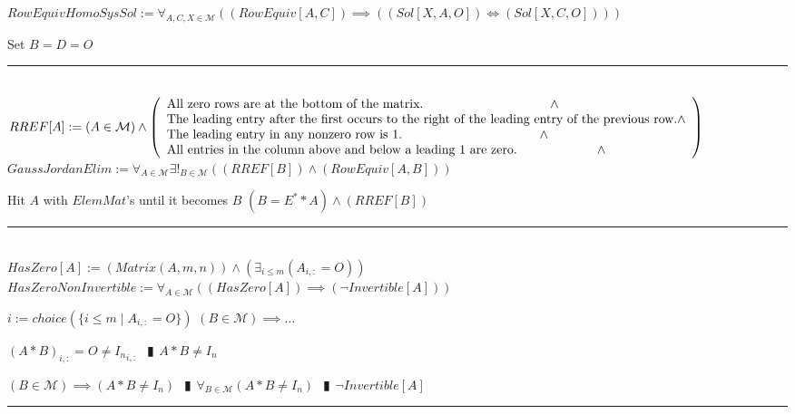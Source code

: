 \documentclass{book}
\newcommand{\abr}{:=}
\newcommand{\pipe}{$\phantom{(}\vrectangleblack\phantom{)}$}
\newcommand{\st}{\mathbin{|}}
\begin{document}
$RowEquivHomoSysSol \abr \forall_{A, C, X \in \mathcal{M}}((RowEquiv[A, C]) \implies ((Sol[X, A, O]) \iff (Sol[X, C, O])))$
\begin{enumerate}
  \lit Set $B = D = O$
\end{enumerate} \vspace{.75mm} \hrule \vspace{.75mm} \ \\ 

$RREF[A] \abr (A \in \mathcal{M}) \land \left(\begin{array}{ll}
  \text{All zero rows are at the bottom of the matrix.} \hfill \land \hfill \\
  \text{The leading entry after the first occurs to the right of the leading entry of the previous row.} \hfill \land \hfill \\
  \text{The leading entry in any nonzero row is 1.} \hfill \land \hfill \\
  \text{All entries in the column above and below a leading 1 are zero.} \hfill \land \hfill \\
\end{array}\right)$ \\

$GaussJordanElim \abr \forall_{A \in \mathcal{M}} \exists!_{B \in \mathcal{M}}((RREF[B]) \land (RowEquiv[A, B]))$
\begin{enumerate}
  \lit Hit $A$ with $ElemMat$'s until it becomes $B$
  \lit $(B = E^* * A) \land (RREF[B])$
\end{enumerate} \vspace{.75mm} \hrule \vspace{.75mm} \ \\ 

$HasZero[A] \abr (Matrix(A, m, n)) \land (\exists_{i \leq m}(A_{i, :} = O))$ \\

$HasZeroNonInvertible \abr \forall_{A \in \mathcal{M}}((HasZero[A]) \implies (\lnot Invertible[A]))$
\begin{enumerate}
  \lit $i \abr choice(\{i \leq m \st A_{i, :} = O\})$
  \lit $(B \in \mathcal{M}) \implies \ldots$
  \begin{enumerate}
    \lit $(A * B)_{i, :} = O \neq {I_n}_{i, :}$ \pipe $A * B \neq I_n$
  \end{enumerate}
  \lit $(B \in \mathcal{M}) \implies (A * B \neq I_n)$ \pipe $\forall_{B \in \mathcal{M}}(A * B \neq I_n)$ \pipe $\lnot Invertible[A]$
\end{enumerate} \vspace{.75mm} \hrule \vspace{.75mm} \ \\ 
\end{document}

